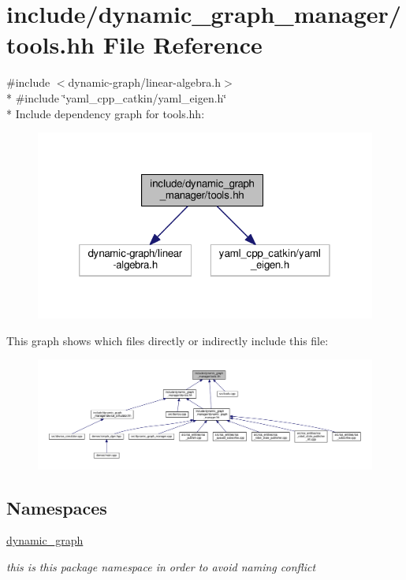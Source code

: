 \hypertarget{tools_8hh}{}\section{include/dynamic\+\_\+graph\+\_\+manager/tools.hh File Reference}
\label{tools_8hh}
{\ttfamily \#include $<$dynamic-\/graph/linear-\/algebra.\+h$>$}\\*
{\ttfamily \#include \char`\"{}yaml\+\_\+cpp\+\_\+catkin/yaml\+\_\+eigen.\+h\char`\"{}}\\*
Include dependency graph for tools.\+hh\+:
\nopagebreak
\begin{figure}[H]
\begin{center}
\leavevmode
\includegraphics[width=320pt]{tools_8hh__incl}
\end{center}
\end{figure}
This graph shows which files directly or indirectly include this file\+:
\nopagebreak
\begin{figure}[H]
\begin{center}
\leavevmode
\includegraphics[width=350pt]{tools_8hh__dep__incl}
\end{center}
\end{figure}
\subsection*{Namespaces}
\begin{DoxyCompactItemize}
\item 
 \hyperlink{namespacedynamic__graph}{dynamic\+\_\+graph}
\begin{DoxyCompactList}\small\item\em this is this package namespace in order to avoid naming conflict \end{DoxyCompactList}\end{DoxyCompactItemize}
